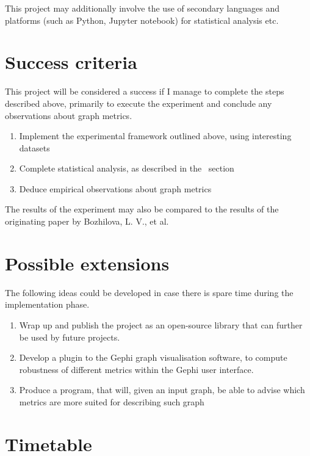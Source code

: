 \documentclass[12pt,a4paper,twoside]{article}
\begin{document}
	This project may additionally involve the use of secondary languages and platforms (such as Python, Jupyter notebook) for statistical analysis etc.

\section*{Success criteria}

	This project will be considered a success if I manage to complete the steps described above, primarily to execute the experiment and conclude any observations about graph metrics.
	
	\begin{enumerate}
	    \item Implement the experimental framework outlined above, using interesting datasets
	    \item Complete statistical analysis, as described in the~ section
	    \item Deduce empirical observations about graph metrics
	\end{enumerate}
	
	The results of the experiment may also be compared to the results of the originating paper by Bozhilova, L. V., et al.

\section*{Possible extensions}

    The following ideas could be developed in case there is spare time during the implementation phase.
    
    \begin{enumerate}
        \item Wrap up and publish the project as an open-source library that can further be used by future projects.
        \item Develop a plugin to the Gephi graph visualisation software, to compute robustness of different metrics within the Gephi user interface.
        \item Produce a program, that will, given an input graph, be able to advise which metrics are more suited for describing such graph
    \end{enumerate}

\section*{Timetable}
\end{document}
